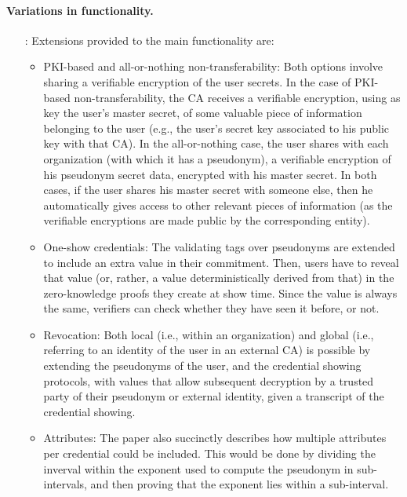 \paragraph{Variations in functionality.}

\begin{enumerate}
\item[\cite{cl01}:] Extensions provided to the main functionality are:
  \begin{itemize}
  \item PKI-based and all-or-nothing non-transferability: Both options
    involve sharing a verifiable encryption of the user secrets. In the
    case of PKI-based non-transferability, the CA receives a verifiable
    encryption, using as key the user's master secret, of some valuable
    piece of information belonging to the user (e.g., the user's secret
    key associated to his public key with that CA). In the all-or-nothing
    case, the user shares with each organization (with which it has a
    pseudonym), a verifiable encryption of his pseudonym secret data, encrypted
    with his master secret. In both cases, if the user shares his master
    secret with someone else, then he automatically gives access to
    other relevant pieces of information (as the verifiable encryptions are
    made public by the corresponding entity).    
  \item One-show credentials: The validating tags over pseudonyms are extended
    to include an extra value in their commitment. Then, users have to reveal
    that value (or, rather, a value deterministically derived from that) in the
    zero-knowledge proofs they create at show time. Since the value is always
    the same, verifiers can check whether they have seen it before, or not.
  \item Revocation: Both local (i.e., within an organization) and global (i.e.,
    referring to an identity of the user in an external CA) is possible by
    extending the pseudonyms of the user, and the credential showing protocols,
    with values that allow subsequent decryption by a trusted party of their
    pseudonym or external identity, given a transcript of the credential
    showing.    
  \item Attributes: The paper also succinctly describes how multiple attributes
    per credential could be included. This would be done by dividing the inverval
    within the exponent used to compute the pseudonym in sub-intervals, and then
    proving that the exponent lies within a sub-interval.
  \end{itemize}

\end{enumerate}
